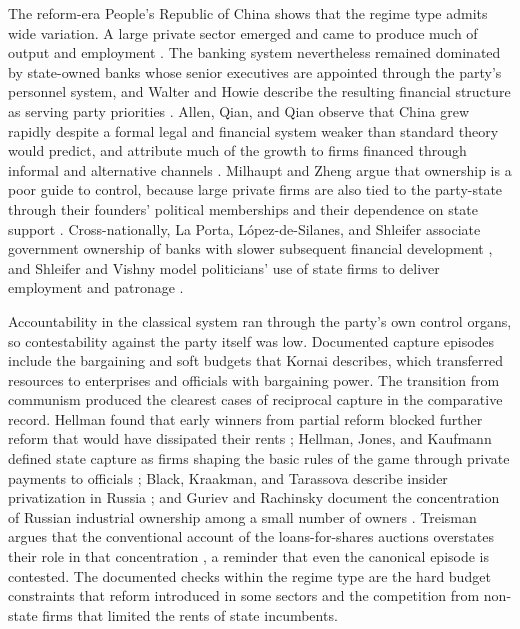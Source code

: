 \documentclass[11pt,letterpaper]{article}
\theoremstyle{definition}
\theoremstyle{remark}
\begin{document}
The reform-era People's Republic of China shows that the regime type admits wide variation. A large private sector emerged and came to produce much of output and employment \citep{lardy2014,naughton2007}. The banking system nevertheless remained dominated by state-owned banks whose senior executives are appointed through the party's personnel system, and Walter and Howie describe the resulting financial structure as serving party priorities \citep{walterhowie2011}. Allen, Qian, and Qian observe that China grew rapidly despite a formal legal and financial system weaker than standard theory would predict, and attribute much of the growth to firms financed through informal and alternative channels \citep{allen2005}. Milhaupt and Zheng argue that ownership is a poor guide to control, because large private firms are also tied to the party-state through their founders' political memberships and their dependence on state support \citep{milhaupt2015}. Cross-nationally, La Porta, L\'opez-de-Silanes, and Shleifer associate government ownership of banks with slower subsequent financial development \citep{laporta2002}, and Shleifer and Vishny model politicians' use of state firms to deliver employment and patronage \citep{shleifer1994}.

Accountability in the classical system ran through the party's own control organs, so contestability against the party itself was low. Documented capture episodes include the bargaining and soft budgets that Kornai describes, which transferred resources to enterprises and officials with bargaining power. The transition from communism produced the clearest cases of reciprocal capture in the comparative record. Hellman found that early winners from partial reform blocked further reform that would have dissipated their rents \citep{hellman1998}; Hellman, Jones, and Kaufmann defined state capture as firms shaping the basic rules of the game through private payments to officials \citep{hellman2000}; Black, Kraakman, and Tarassova describe insider privatization in Russia \citep{black2000}; and Guriev and Rachinsky document the concentration of Russian industrial ownership among a small number of owners \citep{guriev2005}. Treisman argues that the conventional account of the loans-for-shares auctions overstates their role in that concentration \citep{treisman2010}, a reminder that even the canonical episode is contested. The documented checks within the regime type are the hard budget constraints that reform introduced in some sectors and the competition from non-state firms that limited the rents of state incumbents.
\end{document}
